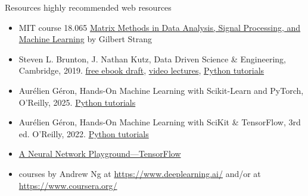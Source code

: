 \documentclass[mathserif, aspectratio=1610]{intbeamer}
\begin{document}
\begin{frame}{Resources}
  highly recommended web resources
  \begin{itemize}
    \item MIT course 18.065 \href{https://ocw.mit.edu/courses/18-065-matrix-methods-in-data-analysis-signal-processing-and-machine-learning-spring-2018/}{Matrix Methods in Data Analysis, Signal Processing, and Machine Learning} by Gilbert Strang
    \item Steven L. Brunton, J. Nathan Kutz, Data Driven Science \& Engineering, Cambridge, 2019.
    \href{http://www.databookuw.com/databook.pdf}{free ebook draft},
    \href{http://www.databookuw.com/}{video lectures},
    \href{https://github.com/dylewsky/Data_Driven_Science_Python_Demos}{Python tutorials}
    \item Aur\'{e}lien G\'{e}ron, Hands-On Machine Learning with Scikit-Learn and PyTorch, O'Reilly, 2025.
    \href{https://github.com/ageron/handson-mlp}{Python tutorials}
    \item Aur\'{e}lien G\'{e}ron, Hands-On Machine Learning with SciKit \& TensorFlow, 3rd ed. O'Reilly, 2022.
    \href{https://github.com/ageron/handson-ml3}{Python tutorials}
    \item \href{https://playground.tensorflow.org}{A Neural Network Playground---TensorFlow}
    \item courses by Andrew Ng at \url{https://www.deeplearning.ai/} and/or at \url{https://www.coursera.org/}
  \end{itemize}
\end{frame}
\end{document}
